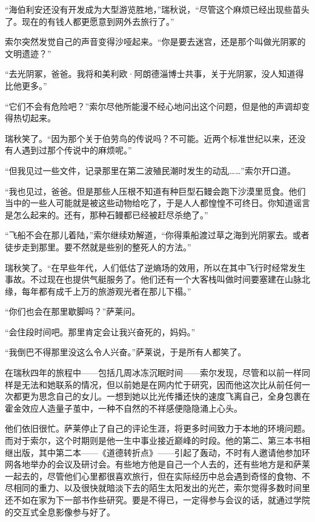 \documentclass[AutoFakeBold=true]{book}
\begin{document}
``海伯利安还没有开发成为大型游览胜地，''瑞秋说，``尽管这个麻烦已经出现些苗头了。现在的有钱人都更愿意到网外去旅行了。''

索尔突然发觉自己的声音变得沙哑起来。``你是要去迷宫，还是那个叫做光阴冢的文明遗迹？''

``去光阴冢，爸爸。我将和美利欧·阿朗德淄博士共事，关于光阴冢，没人知道得比他更多。''

``它们不会有危险吧？''索尔尽他所能漫不经心地问出这个问题，但是他的声调却变得热切起来。

瑞秋笑了。``因为那个关于伯劳鸟的传说吗？不可能。近两个标准世纪以来，还没有人遇到过那个传说中的麻烦呢。''

``但我见过一些文件，记录那里在第二波殖民潮时发生的动乱……''索尔开口道。

``我也见过，爸爸。但是那些人压根不知道有种巨型石鳗会跑下沙漠里觅食。他们当中的一些人可能就是被这些动物给吃了，于是人人都惶惶不可终日。你知道谣言是怎么起来的。还有，那种石鳗都已经被赶尽杀绝了。''

``飞船不会在那儿着陆，''索尔继续劝解道，``你得乘船渡过草之海到光阴冢去。或者徒步走到那里。要不然就是些别的整死人的方法。''

瑞秋笑了。``在早些年代，人们低估了逆熵场的效用，所以在其中飞行时经常发生事故。不过现在也提供气艇服务了。他们还有一个大客栈叫做时间要塞建在山脉北缘，每年都有成千上万的旅游观光者在那儿下榻。''

``你们也会在那里歇脚吗？''萨莱问。

``会住段时间吧。那里肯定会让我兴奋死的，妈妈。''

``我倒巴不得那里没这么令人兴奋。''萨莱说，于是所有人都笑了。

\vspace*{1em}

在瑞秋四年的旅程中——包括几周冰冻沉眠时间——索尔发现，尽管和以前一样同样是无法和她联系的情况，但以前她是在网内忙于研究，因而他这次比从前任何一次都更为思念自己的女儿。一想到她以比光传播还快的速度飞离自己，全身包裹在霍金效应人造量子茧中，一种不自然的不祥感便隐隐涌上心头。

他们依旧很忙。萨莱停止了自己的评论生涯，将更多时间致力于本地的环境问题。而对于索尔，这个时期则是他一生中事业接近巅峰的时段。他的第二、第三本书相继出版，其中第二本——《道德转折点》——引起了轰动，不时有人邀请他参加环网各地举办的会议及研讨会。有些地方他是自己一个人去的，还有些地方是和萨莱一起去的，尽管他们心里都很喜欢旅行，但在实际经历中总会遇到奇怪的食物、不尽相同的重力、以及很快就暗淡下去的陌生太阳发出的光芒，索尔觉得多数时间里还不如在家为下一部书作些研究。要是不得已，一定得参与会议的话，就通过学院的交互式全息影像参与好了。
\end{document}

